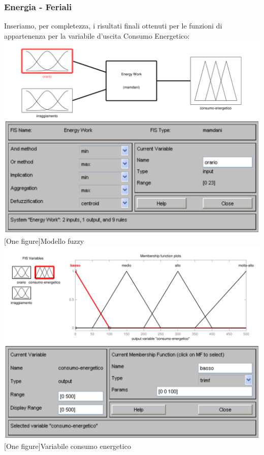 \subsubsection{Energia - Feriali}
Inseriamo, per completezza, i risultati finali ottenuti per le funzioni di appartenenza per la variabile d'uscita Consumo Energetico:\\
\vspace{20px}
\includegraphics[scale=0.5]{images/fuzzy/modello_fuzzy.pdf}
[One figure]{Modello fuzzy}
\vspace{20px}
\includegraphics[scale=0.5]{images/fuzzy/variabile_consumo_energetico.pdf}
[One figure]{Variabile consumo energetico}
\vspace{20px}
